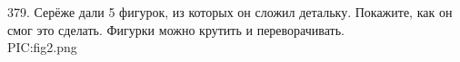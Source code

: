 379. Серёже дали 5 фигурок, из которых он сложил детальку. Покажите, как он смог это сделать.
Фигурки можно крутить и переворачивать.\\
{{PIC:fig2.png}}\\
